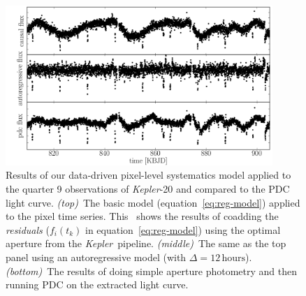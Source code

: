 \documentclass[letterpaper,12pt,preprint]{aastex}
\newcommand{\observatory}[1]{\textsl{#1}}
\newcommand{\Kepler}{\observatory{Kepler}}
\begin{document}
\clearpage

\begin{figure}
\includegraphics[width=0.9\textwidth]{../whitepaper/kepler-20.png}%
\caption{Results of our data-driven pixel-level systematics model applied to
the quarter 9 observations of \Kepler-20 and compared to the PDC light curve.
\textsl{(top)}~The basic model (equation~\ref{eq:reg-model}) applied to the
pixel time series. This \figurename\ shows the results of coadding the
\emph{residuals} ($f_i (t_k)$ in equation~\ref{eq:reg-model}) using the
optimal aperture from the \Kepler\ pipeline.
\textsl{(middle)}~The same as the top panel using an autoregressive model
(with $\Delta = 12\,\mathrm{hours}$).
\textsl{(bottom)}~The results of doing simple aperture photometry and then
running PDC on the extracted light curve. \label{fig:reg-model}}
\end{figure}
\end{document}
